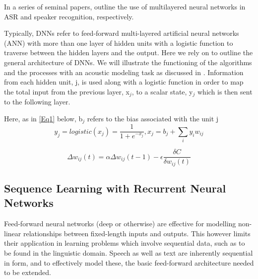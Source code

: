 \documentclass{article}[12pt]
\begin{document}
In a series of seminal papers, \cite{bengio1989_acm,bengio1989} outline the use of multilayered neural networks in ASR and speaker recognition, respectively.

Typically, DNNs refer to feed-forward multi-layered artificial neural networks (ANN) with more than one layer of hidden units with a logistic function to traverse between the hidden layers and the output. Here we rely on \cite{hinton2012} to outline the general architecture of DNNs. We will illustrate the functioning of the algorithms and the processes with an acoustic modeling task as discussed in \cite{hinton2012}. Information from each hidden unit, j, is used along with a logistic function in order to map the total input from the previous layer, x$_j$, to a scalar state, y$_j$ which is then sent to the following layer.

Here, as in \ref{Eq1} below, b$_j$ refers to the bias associated with the unit j
\begin{equation}
y_{j}=logistic(x_{j})=\frac{1}{1+e^{-x_{j}}}, x_{j} = b_{j} + \sum_{i}y_{i}w_{ij}
\label{Eq1}
\end{equation}


\begin{equation}
\Delta w_{ij}(t)=\alpha\Delta w_{ij}(t-1) - \epsilon \frac{\delta C}{\delta w_{ij}(t)}
\label{Eq4}
\end{equation}


\subsection{Sequence Learning with Recurrent Neural Networks}
Feed-forward neural networks (deep or otherwise) are effective for modelling non-linear relationships between fixed-length inputs and outputs. This however limits their application in learning problems which involve sequential data, such as to be found in the linguistic domain. Speech as well as text are inherently sequential in form, and to effectively model these, the basic feed-forward architecture needed to be extended.
\end{document}
